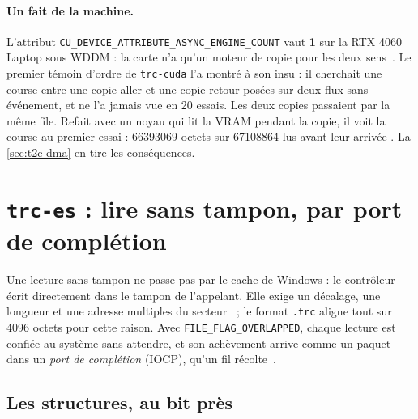 \paragraph{Un fait de la machine.} L'attribut \texttt{CU\_DEVICE\_\allowbreak ATTRIBUTE\_\allowbreak ASYNC\_\allowbreak ENGINE\_\allowbreak COUNT} vaut \textbf{1} sur la RTX 4060 Laptop sous WDDM \mes : la carte n'a qu'un moteur de copie pour les deux sens~\cite{nvidia2026bestpractices}. Le premier témoin d'ordre de \texttt{trc-cuda} l'a montré à son insu : il cherchait une course entre une copie aller et une copie retour posées sur deux flux sans événement, et ne l'a jamais vue en 20 essais. Les deux copies passaient par la même file. Refait avec un noyau qui lit la VRAM pendant la copie, il voit la course au premier essai : \num{66393069} octets sur \num{67108864} lus avant leur arrivée \mes. La \cref{sec:t2c-dma} en tire les conséquences.

\section{\texttt{trc-es} : lire sans tampon, par port de complétion}\label{sec:t2c-es}

Une lecture sans tampon ne passe pas par le cache de Windows : le contrôleur écrit directement dans le tampon de l'appelant. Elle exige un décalage, une longueur et une adresse multiples du secteur~\cite{microsoft2025filebuffering} ; le format \texttt{.trc} aligne tout sur \num{4096} octets pour cette raison. Avec \texttt{FILE\_FLAG\_OVERLAPPED}, chaque lecture est confiée au système sans attendre, et son achèvement arrive comme un paquet dans un \emph{port de complétion} (IOCP), qu'un fil récolte~\cite{microsoft2025iocp}.

\subsection{Les structures, au bit près}


